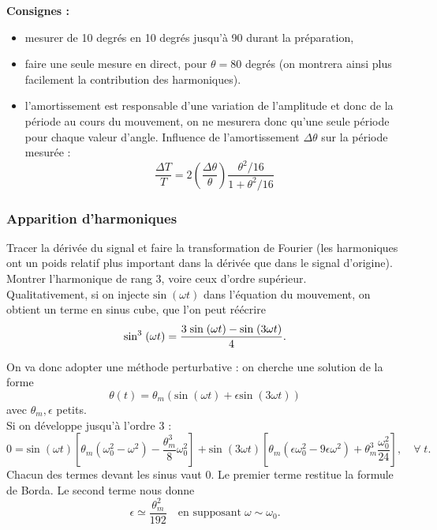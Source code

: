 \documentclass[11pt,a4paper]{report}
\begin{document}
\textbf{Consignes :}
\begin{itemize}
	\item mesurer de 10 degrés en 10 degrés jusqu'à 90 durant la préparation,
	\item faire une seule mesure en direct, pour $\theta = 80$ degrés (on montrera ainsi plus 			facilement la contribution des harmoniques).
	\item l'amortissement est responsable d'une variation de l'amplitude et donc de la période 		au cours du mouvement, on ne mesurera donc qu'une seule période pour chaque valeur d'angle. Influence de l'amortissement $\Delta \theta$ sur la période mesurée :
	\begin{equation}
		\frac{\Delta T}{T} = 2 \left(\frac{\Delta \theta}{\theta}\right) 
		\frac{\theta^2/16}{1 + \theta^2/16}
	\end{equation}
\end{itemize}

\subsubsection*{Apparition d'harmoniques}

Tracer la dérivée du signal et faire la transformation de Fourier (les harmoniques ont un poids relatif plus important dans la dérivée que dans le signal d'origine). Montrer l'harmonique de rang 3, voire ceux d'ordre supérieur.\\

Qualitativement, si on injecte $\text{sin}\;(\omega t)$ dans l'équation du mouvement, on obtient un terme en sinus cube, que l'on peut réécrire
\begin{equation}
	\text{sin}^3\;(\omega t) = \frac{3\;\text{sin}\;(\omega t) - \text{sin}\;(3\omega t)}{4}.\\
\end{equation}

On va donc adopter une méthode perturbative : on cherche une solution de la forme
\begin{equation}
	\theta(t) = \theta_m \left(\text{sin}\;(\omega t) + \epsilon \text{sin}\;(3\omega t)\right)
\end{equation}
avec $\theta_m, \epsilon$ petits.\\

Si on développe jusqu'à l'ordre 3 :
\begin{equation}
	0 = \text{sin}\;(\omega t)\left[\theta_m\left(\omega_0^2 - \omega^2\right) 
	- \frac{\theta_m^3}{8}\omega_0^2\right]
	+ \text{sin}\;(3\omega t)\left[\theta_m\left(\epsilon\omega_0^2 - 9\epsilon\omega^2\right)		+ \theta_m^3\frac{\omega_0^2}{24}\right],\quad\forall\;t.
\end{equation}
Chacun des termes devant les sinus vaut 0. Le premier terme restitue la formule de Borda. Le second terme nous donne
\begin{equation}
	\epsilon \simeq \frac{\theta_m^2}{192} \quad\text{en supposant}\;\omega \sim \omega_0.
\end{equation}
\end{document}
